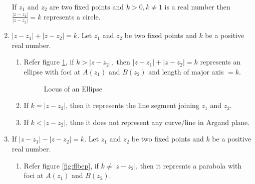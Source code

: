 \begin{enumerate}
  If $z_1$ and $z_2$ are two fixed points and $k > 0, k\neq 1$ is a real number then $\frac{|z- z_1|}{|z - z_2|} = k$ represents a
  circle.
\item $|z - z_1| + |z - z_2| = k$. Let $z_1$ and $z_2$ be two fixed points and $k$ be a positive real number.
  \begin{enumerate}
    \item Refer figure \ref{fig:flbee}, if $k > |z - z_2|,$ then $|z - z_1| + |z - z_2| = k$ represents an ellipse with foci at $A(z_1)$ and $B(z_2)$ and length
      of major axis $= k$.
      \begin{figure}[h]
        \begin{center}
          \caption{\label{fig:flbee}Locus of an Ellipse}
        \end{center}
      \end{figure}
    \item If $k = |z - z_2|$, then it represents the line segment joining $z_1$ and $z_2$.
    \item If $k < |z - z_2|$, thne it does not represent any curve/line in Argand plane.
  \end{enumerate}
\item If $|z - z_1| - |z - z_2| = k$. Let $z_1$ and $z_2$ be two fixed points and $k$ be a positive real number.
  \begin{enumerate}
  \item Refer figure \ref{fig:flbep}, if $k\neq |z - z_2|$, then it represnts a parabola with foci at $A(z_1)$ and $B(z_2)$.
    \begin{figure}[H]
      \begin{center}
\end{center}
\end{figure}
\end{enumerate}
\end{enumerate}
